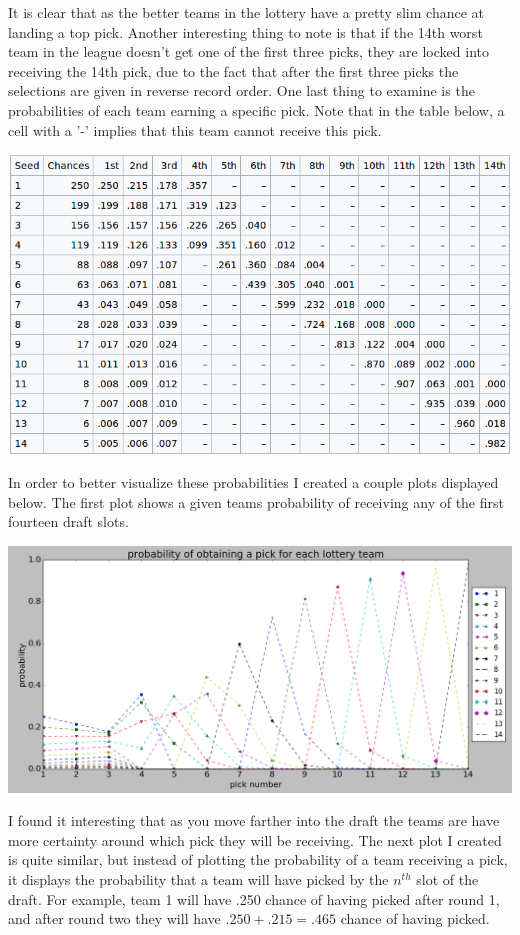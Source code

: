 \documentclass[letterpaper,12pt]{article}
\begin{document}
It is clear that as the better teams in the lottery have a pretty slim chance at landing a top pick. Another interesting thing to note is that if the 14th worst team in the league doesn't get one of the first three picks, they are locked into receiving the 14th pick, due to the fact that after the first three picks the selections are given in reverse record order. One last thing to examine is the probabilities of each team earning a specific pick. Note that in the table below, a cell with a '-' implies that this team cannot receive this pick.
\begin{center}
\includegraphics[scale=0.6]{../images/table.png} 
\end{center} \newpage

In order to better visualize these probabilities I created a couple plots displayed below. The first plot shows a given teams probability of receiving any of the first fourteen draft slots.
\begin{center}
\includegraphics[scale=0.5]{../images/plot1.png} 
\end{center}

I found it interesting that as you move farther into the draft the teams are have more certainty around which pick they will be receiving. The next plot I created is quite similar, but instead of plotting the probability of a team receiving a pick, it displays the probability that a team will have picked by the $n^{th}$ slot of the draft. For example, team 1 will have .250 chance of having picked after round 1, and after round two they will have $.250 + .215 = .465$ chance of having picked.
\end{document}
